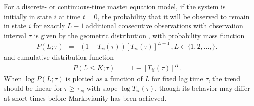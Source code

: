 For a discrete- or continuous-time master equation model, if the system is initially in state $i$ at time $t=0$, the probability that it will be observed to remain in state $i$ for exactly $L-1$ additional consecutive observations with observation interval $\tau$ is given by the geometric distribution \cite{swope:2004a}, with probability mass function
\begin{eqnarray}
P(L ; \tau) &=& (1 - T_{ii}(\tau)) [T_{ii}(\tau)]^{L-1} \:, L \in \{1, 2, \ldots, \} . \label{validation:equation:lifetime-distribution-pmf}
\end{eqnarray}
and cumulative distribution function
\begin{eqnarray}
P(L \le K; \tau) &=& 1 - [T_{ii}(\tau)]^K .		
\end{eqnarray}
When $\log P(L ; \tau)$ is plotted as a function of $L$ for fixed lag time $\tau$, the trend should be linear for $\tau \ge \tau_\mathrm{eq}$ with slope $\log T_{ii}(\tau)$, though its behavior may differ at short times before Markovianity has been achieved.



